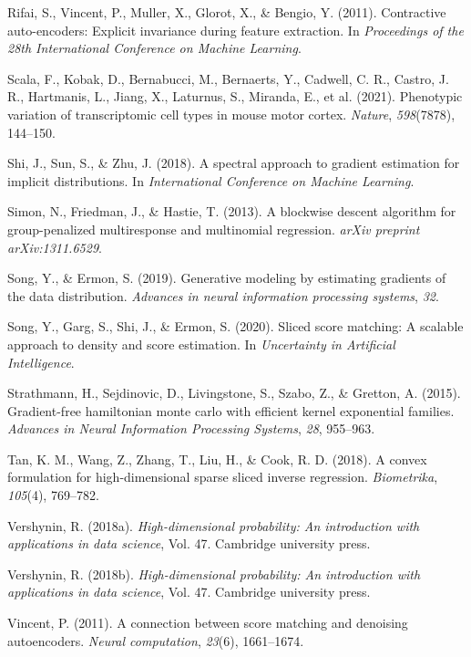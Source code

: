 \documentclass{article}
\begin{document}
\begin{thebibliography}{99}
 Rifai, S., Vincent, P., Muller, X., Glorot, X., \& Bengio, Y. (2011). Contractive auto-encoders: Explicit invariance during feature extraction. In \textit{Proceedings of the 28th International Conference on Machine Learning}.

 Scala, F., Kobak, D., Bernabucci, M., Bernaerts, Y., Cadwell, C. R., Castro, J. R., Hartmanis, L., Jiang, X., Laturnus, S., Miranda, E., et al. (2021). Phenotypic variation of transcriptomic cell types in mouse motor cortex. \textit{Nature}, \textit{598}(7878), 144–150.

 Shi, J., Sun, S., \& Zhu, J. (2018). A spectral approach to gradient estimation for implicit distributions. In \textit{International Conference on Machine Learning}.

 Simon, N., Friedman, J., \& Hastie, T. (2013). A blockwise descent algorithm for group-penalized multiresponse and multinomial regression. \textit{arXiv preprint arXiv:1311.6529}.

 Song, Y., \& Ermon, S. (2019). Generative modeling by estimating gradients of the data distribution. \textit{Advances in neural information processing systems}, \textit{32}.

 Song, Y., Garg, S., Shi, J., \& Ermon, S. (2020). Sliced score matching: A scalable approach to density and score estimation. In \textit{Uncertainty in Artificial Intelligence}.

 Strathmann, H., Sejdinovic, D., Livingstone, S., Szabo, Z., \& Gretton, A. (2015). Gradient-free hamiltonian monte carlo with efficient kernel exponential families. \textit{Advances in Neural Information Processing Systems}, \textit{28}, 955–963.

 Tan, K. M., Wang, Z., Zhang, T., Liu, H., \& Cook, R. D. (2018). A convex formulation for high-dimensional sparse sliced inverse regression. \textit{Biometrika}, \textit{105}(4), 769–782.

 Vershynin, R. (2018a). \textit{High-dimensional probability: An introduction with applications in data science}, Vol. 47. Cambridge university press.

 Vershynin, R. (2018b). \textit{High-dimensional probability: An introduction with applications in data science}, Vol. 47. Cambridge university press.

 Vincent, P. (2011). A connection between score matching and denoising autoencoders. \textit{Neural computation}, \textit{23}(6), 1661–1674.


\end{thebibliography}
\end{document}
